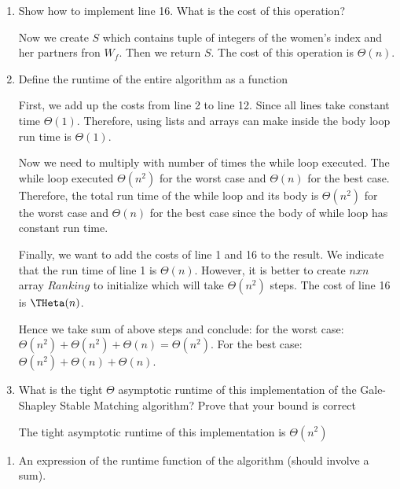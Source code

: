 \documentclass{cpsc413Solutions}
\begin{document}
\begin{problemlist}
\begin{problem}
\begin{answer}
\begin{enumerate}
    \item Show how to implement line 16. What is the cost of this operation?
    
    Now we create $S$ which contains tuple of integers of the women's index and her partners fron $W_f$. Then we return $S$.
    The cost of this operation is $\Theta(n)$.
    
    \item Deﬁne the runtime of the entire algorithm as a function
    
    First, we add up the costs from line 2 to line 12. Since all lines take constant time $\Theta(1)$. Therefore, using lists and arrays can make inside the body loop run time is $\Theta(1)$.
    
    Now we need to multiply with number of times the while loop executed. The while loop executed $\Theta(n^2)$ for the worst case and $\Theta(n)$ for the best case. Therefore, the total run time of the while loop and its body is $\Theta(n^2)$ for the worst case and $\Theta(n)$ for the best case since the body of while loop has constant run time.
    
    Finally, we want to add the costs of line 1 and 16 to the result. We indicate that the run time of line 1 is $\Theta(n)$. However, it is better to create $n x n$ array $Ranking$ to initialize which will take $\Theta(n^2)$ steps. The cost of line 16 is $\THeta(n)$. 
    
    Hence we take sum of above steps and conclude: for the worst case: $\Theta(n^2) + \Theta(n^2) + \Theta (n) = \Theta (n^2)$. For the best case: $\Theta(n^2) + \Theta(n) + \Theta(n)$.
    
    \item What is the tight $\Theta$ asymptotic runtime of this implementation of the Gale-Shapley Stable Matching algorithm? Prove that your bound is correct
    
   The tight asymptotic runtime of this implementation is $\Theta(n^2)$
    
\end{enumerate}
\end{answer}
\end{problem}

\begin{problem}
\begin{answer}
\begin{enumerate}
    \item  An expression of the runtime function of the algorithm (should involve a sum). 
    

\end{enumerate}
\end{answer}
\end{problem}
\end{problemlist}
\end{document}
